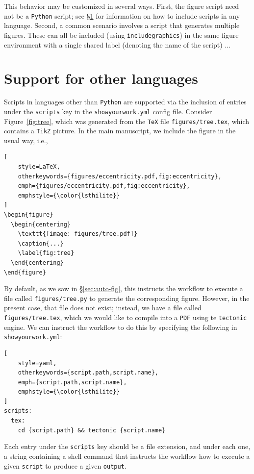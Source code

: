 \documentclass[twocolumn]{aastex631}
\begin{document}
This behavior may be customized in several ways. 
First, the figure script need not be a \texttt{Python} script; see \S\ref{sec:other-lang} for information on how to include scripts in any language.
Second, a common scenario involves a script that generates multiple figures.
These can all be included (using \texttt{includegraphics}) in the same figure environment with a single shared label (denoting the name of the script)
...

\section{Support for other languages}
\label{sec:other-lang}
%
Scripts in languages other than \texttt{Python} are supported via the inclusion of entries under the \texttt{scripts} key in the \texttt{showyourwork.yml} config file. 
Consider Figure~\ref{fig:tree}, which was generated from the \texttt{TeX} file \texttt{figures/tree.tex}, which contains a \texttt{TikZ} picture. 
In the main manuscript, we include the figure in the usual way, i.e.,
%
\begin{lstlisting}[
    style=LaTeX,
    otherkeywords={figures/eccentricity.pdf,fig:eccentricity},
    emph={figures/eccentricity.pdf,fig:eccentricity},
    emphstyle={\color{lsthilite}}
]
\begin{figure}
  \begin{centering}
    \texttt{[image: figures/tree.pdf]}
    \caption{...}
    \label{fig:tree}
  \end{centering}
\end{figure}
\end{lstlisting}
%
By default, as we saw in \S\ref{sec:auto-fig}, this instructs the workflow to execute a file called \texttt{figures/tree.py} to generate the corresponding figure. 
However, in the present case, that file does not exist; instead, we have a file called \texttt{figures/tree.tex}, which we would like to compile into a \texttt{PDF} using te \texttt{tectonic} engine.
We can instruct the workflow to do this by specifying the following in \texttt{showyourwork.yml}:
%
\begin{lstlisting}[
    style=yaml,
    otherkeywords={script.path,script.name},
    emph={script.path,script.name},
    emphstyle={\color{lsthilite}}
]
scripts:
  tex:
    cd {script.path} && tectonic {script.name}
\end{lstlisting}
%
Each entry under the \texttt{scripts} key should be a file extension, and under each one, a string containing a shell command that instructs the workflow how to execute a given {\color{lsthilite}\texttt{script}} to produce a given {\color{lsthilite}\texttt{output}}.
\end{document}
